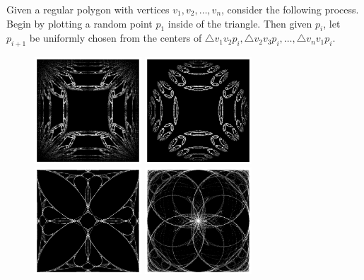 \documentclass{article}
\begin{document}
Given a regular polygon with vertices $v_1, v_2, \dots, v_n$,
consider the following process.
Begin by plotting a random point $p_1$ inside of the triangle.
Then given $p_i$, let $p_{i+1}$ be uniformly chosen from the centers of
$\triangle v_1v_2p_i, \triangle v_2v_3p_i, \dots, \triangle v_nv_1p_i$.
\begin{figure}[ht!]
  \noindent
  \includegraphics[width=4cm]{assets/129_problem/Square_X001.png}
  \includegraphics[width=4cm]{assets/129_problem/Square_X202.png}
  \includegraphics[width=4cm]{assets/129_problem/Square_X220.png}
  \includegraphics[width=4cm]{assets/129_problem/Square_X244.png}


\end{figure}
\end{document}
